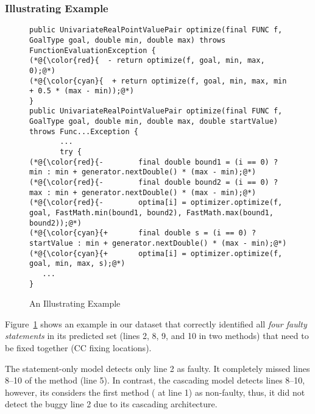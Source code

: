 \subsubsection{{\bf Illustrating Example}}
\label{sec:example}

\begin{figure}[t]
	\centering
	\begin{lstlisting}[]
public UnivariateRealPointValuePair optimize(final FUNC f, GoalType goal, double min, double max) throws FunctionEvaluationException {
(*@{\color{red}{  - return optimize(f, goal, min, max, 0);@*)
(*@{\color{cyan}{  + return optimize(f, goal, min, max, min + 0.5 * (max - min));@*)
}
public UnivariateRealPointValuePair optimize(final FUNC f, GoalType goal, double min, double max, double startValue) throws Func...Exception {
       ...
       try {
(*@{\color{red}{-        final double bound1 = (i == 0) ? min : min + generator.nextDouble() * (max - min);@*)
(*@{\color{red}{-        final double bound2 = (i == 0) ? max : min + generator.nextDouble() * (max - min);@*)
(*@{\color{red}{-        optima[i] = optimizer.optimize(f, goal, FastMath.min(bound1, bound2), FastMath.max(bound1, bound2));@*)
(*@{\color{cyan}{+       final double s = (i == 0) ? startValue : min + generator.nextDouble() * (max - min);@*)
(*@{\color{cyan}{+       optima[i] = optimizer.optimize(f, goal, min, max, s);@*)
   ...
}
\end{lstlisting}
        \vspace{-15pt}
	\caption{An Illustrating Example}
	\label{example}
\end{figure}

Figure~\ref{example} shows an example in our dataset that {\tool}
correctly identified all {\em four faulty statements} in its predicted
set (lines 2, 8, 9, and 10 in two methods) that need to be fixed
together (CC fixing locations).

The statement-only model detects only line 2 as faulty. It completely
missed lines 8--10 of the  method (line 5). In contrast,
the cascading model detects lines 8--10, however, its 
considers the first method ( at line 1) as
non-faulty, thus, it did not detect the buggy line 2 due
to its cascading architecture.

